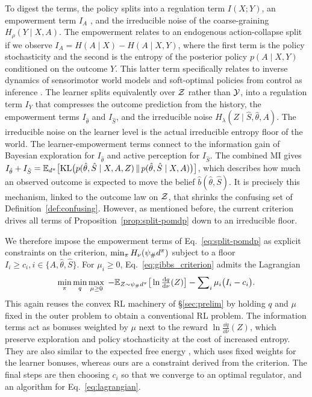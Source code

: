 To digest the terms, the policy splits into a regulation term $I(X;Y)$, an empowerment term $I_A$ \citep{Klyubin-all05}, and the irreducible noise of the coarse-graining $H_\rho(Y \mid X,A)$.
The empowerment relates to an endogenous action-collapse split if we observe $I_A = H(A \mid X) - H(A \mid X, Y)$, where the first term is the policy stochasticity and the second is the entropy of the posterior policy $p(A \mid X, Y)$ conditioned on the outcome $Y$.
This latter term specifically relates to inverse dynamics of sensorimotor world models \citep{Ivashkov-smwm26} and soft-optimal policies from control as inference \citep[see \S\ref{sec:related},][]{Levine-reinforcement18}.
The learner splits equivalently over $\mathcal Z$ rather than $\mathcal Y$, into a regulation term $I_Y$ that compresses the outcome prediction from the history, the empowerment terms $I_{\hat\theta}$ and $I_{\hat S}$, and the irreducible noise $H_\lambda(Z \mid \hat S,\hat\theta,A)$.
The irreducible noise on the learner level is the actual irreducible entropy floor of the world.
The learner-empowerment terms connect to the information gain of Bayesian exploration \citep{MacKay-informationbased92} for $I_{\hat\theta}$ and active perception \citep{Bajcsy-active88} for $I_{\hat S}$.
The combined MI gives $I_{\hat\theta} + I_{\hat S} = \mathbb E_{d^{\pi}}\big[\mathrm{KL}\big(p(\hat\theta,\hat S \mid X,A,Z) \,\|\, p(\hat\theta,\hat S \mid X,A)\big)\big]$, which describes how much an observed outcome is expected to move the belief $\hat b(\hat \theta, \hat S)$.
It is precisely this mechanism, linked to the outcome law on $\mathcal Z$, that shrinks the confusing set of Definition~\ref{def:confusing}.
However, as mentioned before, the current criterion drives all terms of Proposition~\ref{prop:split-pomdp} down to an irreducible floor.


We therefore impose the empowerment terms of Eq.~\eqref{eq:split-pomdp} as explicit constraints on the criterion, $\min_\pi H_\nu(\psi_\#d^{\pi})$ subject to a floor $I_i \ge c_i, i \in \{A, \hat\theta, \hat S\}$.
For $\mu_i \ge 0$, Eq.~\eqref{eq:gibbs_criterion} admits the Lagrangian
\begin{equation} \label{eq:lagrangian}
  \min_\pi \min_q \max_{\mu \ge 0} \; -\mathbb E_{Z \sim \psi_\#d^{\pi}}\big[\ln \tfrac{\mathrm d q}{\mathrm d\nu}(Z)\big] - \sum\nolimits_{i} \mu_i \big(I_i - c_i\big).
\end{equation}
This again reuses the convex RL machinery of \S\ref{sec:prelim} by holding $q$ and $\mu$ fixed in the outer problem to obtain a conventional RL problem.
The information terms act as bonuses weighted by $\mu$ next to the reward $\ln \tfrac{\dd q}{\dd\nu}(Z)$, which preserve exploration and policy stochasticity at the cost of increased entropy.
They are also similar to the expected free energy \citep{Friston-active15}, which uses fixed weights for the learner bonuses, whereas ours are a constraint derived from the criterion.
The final steps are then choosing $c_i$ so that we converge to an optimal regulator, and an algorithm for Eq.~\eqref{eq:lagrangian}.



